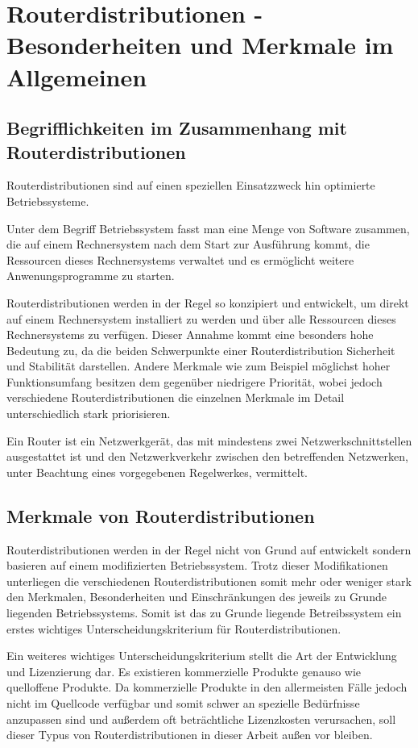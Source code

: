 \documentclass[a4paper,12pt]{scrartcl}
\begin{document}
\section{Routerdistributionen - Besonderheiten und Merkmale im Allgemeinen}

\subsection{Begrifflichkeiten im Zusammenhang mit Routerdistributionen}
Routerdistributionen sind auf einen speziellen Einsatzzweck hin optimierte
Betriebssysteme.

Unter dem Begriff Betriebssystem fasst man eine Menge von Software zusammen, die
auf einem Rechnersystem nach dem Start zur Ausführung kommt, die Ressourcen
dieses Rechnersystems verwaltet und es ermöglicht weitere Anwenungsprogramme zu
starten.

Routerdistributionen werden in der Regel so konzipiert und entwickelt,
um direkt auf einem Rechnersystem installiert zu werden und über alle Ressourcen
dieses Rechnersystems zu verfügen. Dieser Annahme kommt eine besonders hohe
Bedeutung zu, da die beiden Schwerpunkte einer Routerdistribution Sicherheit und
Stabilität darstellen. Andere Merkmale wie zum Beispiel m\"oglichst hoher
Funktionsumfang besitzen dem gegen\"uber niedrigere Priorit\"at, wobei jedoch
verschiedene Routerdistributionen die einzelnen Merkmale im
Detail unterschiedlich stark priorisieren.

Ein Router ist ein Netzwerkgerät, das mit mindestens zwei
Netzwerkschnittstellen ausgestattet ist und den Netzwerkverkehr zwischen den
betreffenden Netzwerken, unter Beachtung eines vorgegebenen Regelwerkes,
vermittelt.

\subsection{Merkmale von Routerdistributionen}
Routerdistributionen werden in der Regel nicht von Grund auf entwickelt sondern
basieren auf einem modifizierten Betriebssystem. Trotz dieser Modifikationen
unterliegen die verschiedenen Routerdistributionen somit mehr oder weniger
stark den Merkmalen, Besonderheiten und Einschr\"ankungen des jeweils zu Grunde
liegenden Betriebssystems. Somit ist das zu Grunde liegende Betreibssystem ein
erstes wichtiges Unterscheidungskriterium f\"ur Routerdistributionen.

Ein weiteres wichtiges Unterscheidungskriterium stellt die Art der Entwicklung
und Lizenzierung dar. Es existieren kommerzielle Produkte genauso wie
quelloffene Produkte. Da kommerzielle Produkte in den allermeisten F\"alle
jedoch nicht im Quellcode verf\"ugbar und somit schwer an spezielle
Bed\"urfnisse anzupassen sind und au\ss{}erdem oft betr\"achtliche Lizenzkosten
verursachen, soll dieser Typus von Routerdistributionen in dieser Arbeit
au\ss{}en vor bleiben. 
 
\end{document}
